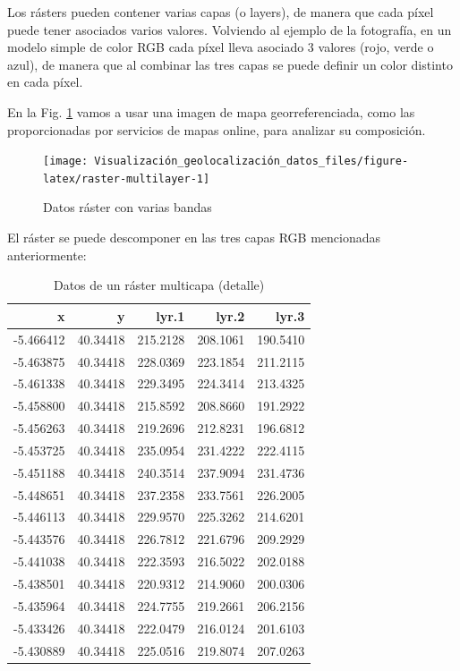 \documentclass[
]{book}
\theoremstyle{definition}
\theoremstyle{definition}
\theoremstyle{definition}
\theoremstyle{definition}
\theoremstyle{remark}
\begin{document}
Los rásters pueden contener varias capas (o layers), de manera que cada píxel
puede tener asociados varios valores. Volviendo al ejemplo de la fotografía, en
un modelo simple de color RGB cada píxel lleva asociado 3 valores (rojo, verde o
azul), de manera que al combinar las tres capas se puede definir un color
distinto en cada píxel.

En la Fig. \ref{fig:raster-multilayer} vamos a usar una imagen de mapa
georreferenciada, como las proporcionadas por servicios de mapas online, para
analizar su composición.

\begin{figure}

{\centering \texttt{[image: Visualización\_geolocalización\_datos\_files/figure-latex/raster-multilayer-1]} 

}

\caption{Datos ráster con varias bandas}\label{fig:raster-multilayer}
\end{figure}

El ráster se puede descomponer en las tres capas RGB mencionadas anteriormente:

\begin{table}

\caption{\label{tab:detalle-pixel-multicapa}Datos de un ráster multicapa (detalle)}
\centering
\begin{tabular}[t]{r|r|r|r|r}
\hline
x & y & lyr.1 & lyr.2 & lyr.3\\
\hline
-5.466412 & 40.34418 & 215.2128 & 208.1061 & 190.5410\\
\hline
-5.463875 & 40.34418 & 228.0369 & 223.1854 & 211.2115\\
\hline
-5.461338 & 40.34418 & 229.3495 & 224.3414 & 213.4325\\
\hline
-5.458800 & 40.34418 & 215.8592 & 208.8660 & 191.2922\\
\hline
-5.456263 & 40.34418 & 219.2696 & 212.8231 & 196.6812\\
\hline
-5.453725 & 40.34418 & 235.0954 & 231.4222 & 222.4115\\
\hline
-5.451188 & 40.34418 & 240.3514 & 237.9094 & 231.4736\\
\hline
-5.448651 & 40.34418 & 237.2358 & 233.7561 & 226.2005\\
\hline
-5.446113 & 40.34418 & 229.9570 & 225.3262 & 214.6201\\
\hline
-5.443576 & 40.34418 & 226.7812 & 221.6796 & 209.2929\\
\hline
-5.441038 & 40.34418 & 222.3593 & 216.5022 & 202.0188\\
\hline
-5.438501 & 40.34418 & 220.9312 & 214.9060 & 200.0306\\
\hline
-5.435964 & 40.34418 & 224.7755 & 219.2661 & 206.2156\\
\hline
-5.433426 & 40.34418 & 222.0479 & 216.0124 & 201.6103\\
\hline
-5.430889 & 40.34418 & 225.0516 & 219.8074 & 207.0263\\
\hline
\end{tabular}
\end{table}
\end{document}
